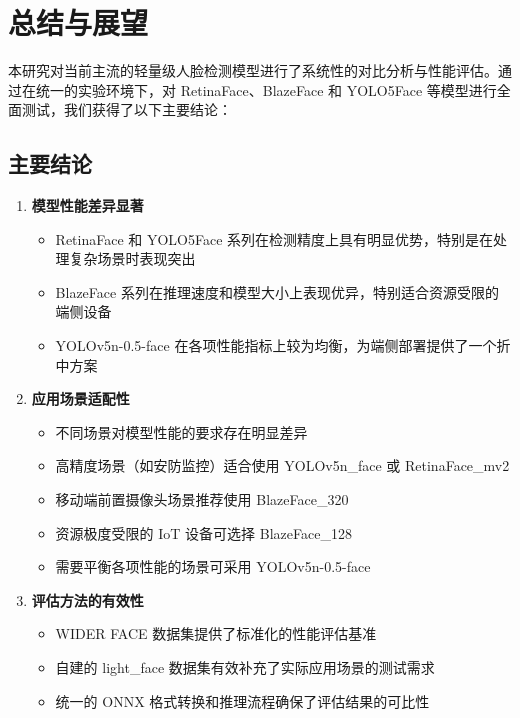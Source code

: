\documentclass{article}
\begin{document}
\clearpage

\section{总结与展望}
本研究对当前主流的轻量级人脸检测模型进行了系统性的对比分析与性能评估。通过在统一的实验环境下，对 RetinaFace、BlazeFace 和 YOLO5Face 等模型进行全面测试，我们获得了以下主要结论：

\subsection{主要结论}

\begin{enumerate}
    \item \textbf{模型性能差异显著}
    \begin{itemize}
        \item RetinaFace 和 YOLO5Face 系列在检测精度上具有明显优势，特别是在处理复杂场景时表现突出
        \item BlazeFace 系列在推理速度和模型大小上表现优异，特别适合资源受限的端侧设备
        \item YOLOv5n-0.5-face 在各项性能指标上较为均衡，为端侧部署提供了一个折中方案
    \end{itemize}

    \item \textbf{应用场景适配性}
    \begin{itemize}
        \item 不同场景对模型性能的要求存在明显差异
        \item 高精度场景（如安防监控）适合使用 YOLOv5n\_face 或 RetinaFace\_mv2
        \item 移动端前置摄像头场景推荐使用 BlazeFace\_320
        \item 资源极度受限的 IoT 设备可选择 BlazeFace\_128
        \item 需要平衡各项性能的场景可采用 YOLOv5n-0.5-face
    \end{itemize}

    \item \textbf{评估方法的有效性}
    \begin{itemize}
        \item WIDER FACE 数据集提供了标准化的性能评估基准
        \item 自建的 light\_face 数据集有效补充了实际应用场景的测试需求
        \item 统一的 ONNX 格式转换和推理流程确保了评估结果的可比性
    \end{itemize}
\end{enumerate}
\end{document}
